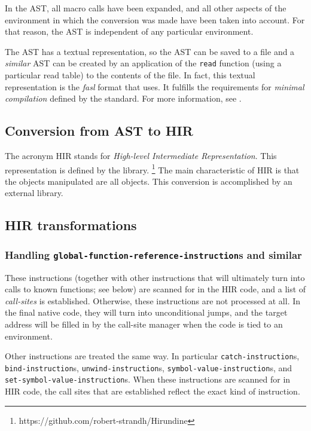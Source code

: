 In the AST, all macro calls have been expanded, and all other aspects
of the environment in which the conversion was made have been taken
into account.  For that reason, the AST is independent of any
particular environment.

The AST has a textual representation, so the AST can be saved to a
file and a \emph{similar} AST can be created by an application of the
\texttt{read} function (using a particular read table) to the contents
of the file.  In fact, this textual representation is the \emph{fasl}
format that \sysname{} uses.  It fulfills the requirements for
\emph{minimal compilation} defined by the \commonlisp{} standard.
For more information, see .

\subsection{Conversion from AST to HIR}
\label{sec-conversion-from-ast-to-hir}

The acronym HIR stands for \emph{High-level Intermediate
  Representation}.  This representation is defined by the \hirundine{}
library.%
\footnote{https://github.com/robert-strandh/Hirundine}
The main characteristic of HIR is that the objects manipulated are all
\commonlisp{} objects.  This conversion is accomplished by an external
library.

\subsection{HIR transformations}

\subsubsection{Handling \texttt{global-function-reference-instruction}s and similar}

These instructions (together with other instructions that will
ultimately turn into calls to known functions; see below) are scanned
for in the HIR code, and a list of \emph{call-sites} is established.
Otherwise, these instructions are not processed at all.  In the final
native code, they will turn into unconditional jumps, and the target
address will be filled in by the call-site manager when the code is
tied to an environment.

Other instructions are treated the same way.  In particular
\texttt{catch-instruction}s, \texttt{bind-instruction}s,
\texttt{unwind-instruction}s, \texttt{symbol-value-instruction}s, and
\texttt{set-symbol-value-instruction}s.  When these instructions are
scanned for in HIR code, the call sites that are established reflect
the exact kind of instruction.

